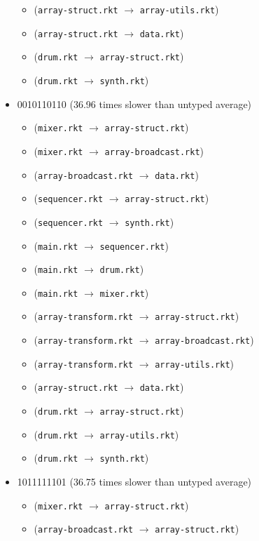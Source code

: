 \documentclass{article}
\newcommand{\mono}[1]{\texttt{#1}}
\begin{document}
\begin{itemize}
\begin{itemize}
  \item (\mono{array-struct.rkt} $\rightarrow$ \mono{array-utils.rkt})
  \item (\mono{array-struct.rkt} $\rightarrow$ \mono{data.rkt})
  \item (\mono{drum.rkt} $\rightarrow$ \mono{array-struct.rkt})
  \item (\mono{drum.rkt} $\rightarrow$ \mono{synth.rkt})
  \end{itemize}
\item 0010110110 (36.96 times slower than untyped average)
  \begin{itemize}
  \item (\mono{mixer.rkt} $\rightarrow$ \mono{array-struct.rkt})
  \item (\mono{mixer.rkt} $\rightarrow$ \mono{array-broadcast.rkt})
  \item (\mono{array-broadcast.rkt} $\rightarrow$ \mono{data.rkt})
  \item (\mono{sequencer.rkt} $\rightarrow$ \mono{array-struct.rkt})
  \item (\mono{sequencer.rkt} $\rightarrow$ \mono{synth.rkt})
  \item (\mono{main.rkt} $\rightarrow$ \mono{sequencer.rkt})
  \item (\mono{main.rkt} $\rightarrow$ \mono{drum.rkt})
  \item (\mono{main.rkt} $\rightarrow$ \mono{mixer.rkt})
  \item (\mono{array-transform.rkt} $\rightarrow$ \mono{array-struct.rkt})
  \item (\mono{array-transform.rkt} $\rightarrow$ \mono{array-broadcast.rkt})
  \item (\mono{array-transform.rkt} $\rightarrow$ \mono{array-utils.rkt})
  \item (\mono{array-struct.rkt} $\rightarrow$ \mono{data.rkt})
  \item (\mono{drum.rkt} $\rightarrow$ \mono{array-struct.rkt})
  \item (\mono{drum.rkt} $\rightarrow$ \mono{array-utils.rkt})
  \item (\mono{drum.rkt} $\rightarrow$ \mono{synth.rkt})
  \end{itemize}
\item 1011111101 (36.75 times slower than untyped average)
  \begin{itemize}
  \item (\mono{mixer.rkt} $\rightarrow$ \mono{array-struct.rkt})
  \item (\mono{array-broadcast.rkt} $\rightarrow$ \mono{array-struct.rkt})

\end{itemize}
\end{itemize}
\end{document}
